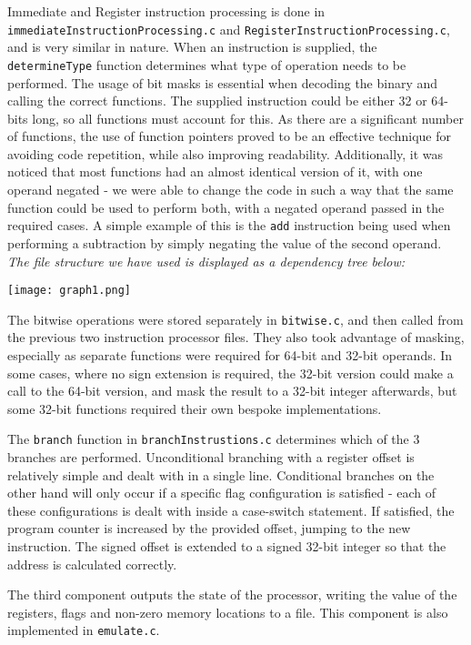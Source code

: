 \documentclass[11pt, oneside, USenglish]{article}
\begin{document}
Immediate and Register instruction processing is done in \verb|immediateInstructionProcessing.c| and \verb|RegisterInstructionProcessing.c|, and is very similar in nature.
When an instruction is supplied, the \verb|determineType| function determines what type of operation needs to be performed.
The usage of bit masks is essential when decoding the binary and calling the correct functions.
The supplied instruction could be either 32 or 64-bits long, so all functions must account for this.
As there are a significant number of functions, the use of function pointers proved to be an effective technique for avoiding code repetition, while also improving readability.
Additionally, it was noticed that most functions had an almost identical version of it, with one operand negated - 
we were able to change the code in such a way that the same function could be used to perform both, with a negated operand passed in the required cases.
A simple example of this is the \verb|add| instruction being used when performing a subtraction by simply negating the value of the second operand.
\newline \emph{The file structure we have used is displayed as a dependency tree below:}
\break

\texttt{[image: graph1.png]}

The bitwise operations were stored separately in \verb|bitwise.c|, and then called from the previous two instruction processor files. They also took advantage of masking, especially as separate functions were required for 64-bit and 32-bit operands. In some cases, where no sign extension is required, the 32-bit version could make a call to the 64-bit version, and mask the result to a 32-bit integer afterwards, but some 32-bit functions required their own bespoke implementations.

The \verb|branch| function in \verb|branchInstrustions.c| determines which of the 3 branches are performed.
Unconditional branching with a register offset is relatively simple and dealt with in a single line.
Conditional branches on the other hand will only occur if a specific flag configuration is satisfied - each of these configurations is dealt with inside a case-switch statement. If satisfied, the program counter is increased by the provided offset, jumping to the new instruction.
The signed offset is extended to a signed 32-bit integer so that the address is calculated correctly.

The third component outputs the state of the processor, writing the value of the registers, flags and non-zero memory locations to a file.
This component is also implemented in \verb|emulate.c|.
\end{document}
